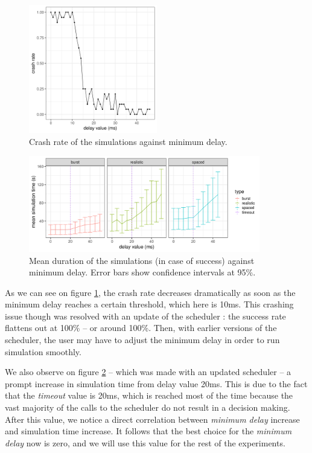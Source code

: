 \begin{figure}
	\centering
	\includegraphics[width=0.5\textwidth]{imgs/min-delay_crash_old.png}
	\caption{Crash rate of the simulations against minimum delay.}
	\label{fig:min-delay_crash}
\end{figure}

\begin{figure}
	\centering
	\includegraphics[width=0.9\textwidth]{imgs/min-delay_duration.png}
	\caption{Mean duration of the simulations (in case of success) against minimum delay. Error bars show confidence intervals at 95\%.}
	\label{fig:min-delay_duration}
\end{figure}

As we can see on figure \ref{fig:min-delay_crash}, the crash rate decreases
dramatically as soon as the minimum delay reaches a certain threshold, which
here is 10ms.  This crashing issue though was resolved with an update of the
scheduler : the success rate flattens out at 100\% -- or around 100\%. Then,
with earlier versions of the scheduler, the user may have to adjust the minimum
delay in order to run simulation smoothly. 

We also observe on figure \ref{fig:min-delay_duration} -- which was made with
an updated scheduler -- a prompt increase in simulation time from delay value
20ms. This is due to the fact that the \textit{timeout} value is 20ms, which is
reached most of the time because the vast majority of the calls to the
scheduler do not result in a decision making. After this value, we notice a
direct correlation between \textit{minimum delay} increase and simulation time
increase. It follows that the best choice for the \textit{minimum delay} now is
zero, and we will use this value for the rest of the experiments.


